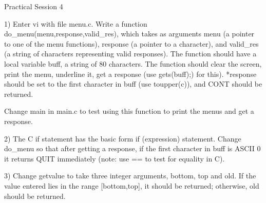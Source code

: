 Practical Session 4

1)    Enter     vi     with     file     menu.c.     Write     a     function
do_menu(menu,response,valid_res), which takes as arguments menu (a pointer to
one of  the menu  functions),  response  (a  pointer  to  a  character),  and
valid_res (a string of characters representing valid responses). The function
should have  a local  variable buff,  a string of 80 characters. The function
should clear  the screen,  print the  menu, underline it, get a response (use
gets(buff);) for  this). *response  should be  set to  the first character in
buff (use toupper(c)), and CONT should be returned.

Change main  in main.c to test using this function to print the menus and get
a response.

2) The  C if  statement has  the basic form if (expression) statement. Change
do_menu so  that after  getting a response, if the first character in buff is
ASCII 0 it returns QUIT immediately (note: use == to test for equality in C).

3) Change  getvalue to  take three integer arguments, bottom, top and old. If
the value  entered lies  in the  range [bottom,top],  it should  be returned;
otherwise, old should be returned.

